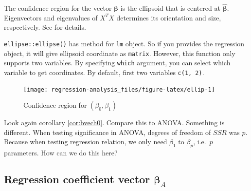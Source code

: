 \documentclass[]{book}
\newenvironment{Shaded}{\begin{snugshade}}{\end{snugshade}}
\newcommand{\CommentTok}[1]{\textcolor[rgb]{0.56,0.35,0.01}{\textit{#1}}}
\newcommand{\DataTypeTok}[1]{\textcolor[rgb]{0.13,0.29,0.53}{#1}}
\newcommand{\KeywordTok}[1]{\textcolor[rgb]{0.13,0.29,0.53}{\textbf{#1}}}
\newcommand{\NormalTok}[1]{#1}
\newcommand{\OperatorTok}[1]{\textcolor[rgb]{0.81,0.36,0.00}{\textbf{#1}}}
\newcommand{\StringTok}[1]{\textcolor[rgb]{0.31,0.60,0.02}{#1}}
\theoremstyle{definition}
\theoremstyle{definition}
\theoremstyle{definition}
\theoremstyle{remark}
\let\BeginKnitrBlock\begin \let\EndKnitrBlock\end
\begin{document}
\BeginKnitrBlock{remark}
{}The confidence region for the vector \(\boldsymbol\beta\) is the ellipsoid that is centered at \(\boldsymbol{\hat\beta}\). Eigenvectors and eigenvalues of \(X^TX\) determines its orientation and size, respectively. See \citet{Johnson:2013aa} for details.
\EndKnitrBlock{remark}

\texttt{ellipse::ellipse()} has method for \texttt{lm} object. So if you provides the regression object, it will give ellipsoid coordinate as \texttt{matrix}. However, this function only supports two variables. By specifying \texttt{which} argument, you can select which variable to get coordinates. By default, first two variables \texttt{c(1,\ 2)}.

\begin{Shaded}
\end{Shaded}

\begin{figure}[H]

{\centering \texttt{[image: regression-analysis\_files/figure-latex/ellip-1]} 

}

\caption{Confidence region for $(\beta_0, \beta_1)$}\label{fig:ellip}
\end{figure}

Look again corollary \ref{cor:bvech0}. Compare this to ANOVA. Something is different. When testing significance in ANOVA, degrees of freedom of \(SSR\) was \(p\). Because when testing regression relation, we only need \(\beta_1\) to \(\beta_p\), i.e.~\(p\) parameters. How can we do this here?

\hypertarget{regression-coefficient-vector-boldsymbolbeta_a}{%
\subsection{\texorpdfstring{Regression coefficient vector \(\boldsymbol\beta_A\)}{Regression coefficient vector \textbackslash boldsymbol\textbackslash beta\_A}}\label{regression-coefficient-vector-boldsymbolbeta_a}}
\end{document}
